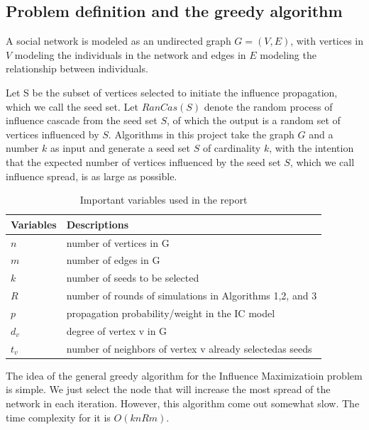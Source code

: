 \documentclass[journal,twoside,web]{ieeecolor}
\begin{document}
\subsection{Problem definition and the greedy algorithm}
A social network is modeled as an undirected graph $G = (V,E)$, with vertices in $V$ modeling the individuals in the network and edges in $E$ modeling the relationship between individuals. \par
Let S be the subset of vertices selected to initiate the influence propagation, which we call the seed set. Let $RanCas(S)$ denote the random process of influence cascade from the seed set $S$, of which the output is a random set of vertices influenced by $S$. Algorithms in this project take the graph $G$ and a number $k$ as input and generate a seed set $S$ of cardinality $k$, with the intention that the expected number of vertices influenced by the seed set $S$, which we call influence spread, is as large as possible.
\par
\begin{table}[]
\centering
\caption{Important variables used in the report}
\label{tab:var}
\begin{tabular}{ll}
\multicolumn{1}{c}{Variables} & Descriptions                                             \\ \hline
$n$                           & number of vertices in G                                  \\
$m$                           & number of edges in G                                     \\
$k$                           & number of seeds to be selected                           \\
$R$                           & number of rounds of simulations in Algorithms 1,2, and 3 \\
$p$                           & propagation  probability/weight in the IC model          \\
$d_v$                         & degree of vertex v in G                                  \\
$t_v$                         & number of neighbors of vertex v already selectedas seeds
\end{tabular}
\end{table}
The idea of the general greedy algorithm for the Influence Maximizatioin problem is simple. We just select the node that will increase the most spread of the network in each iteration. However, this algorithm come out somewhat slow. The time complexity for it is $O(knRm)$.
\end{document}
